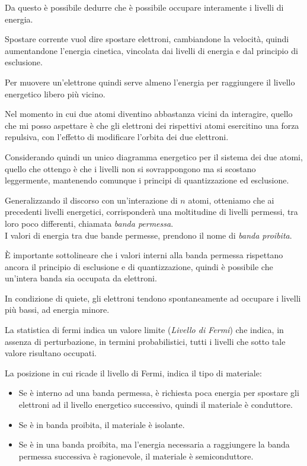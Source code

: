 \documentclass[../template]{subfiles}
\begin{document}
Da questo è possibile dedurre che è possibile occupare interamente i livelli di energia.

Spostare corrente vuol dire spostare elettroni, cambiandone la velocità, quindi aumentandone l'energia cinetica, vincolata dai livelli di energia e dal principio di esclusione.

Per muovere un'elettrone quindi serve almeno l'energia per raggiungere il livello energetico libero più vicino.

Nel momento in cui due atomi diventino abbastanza vicini da interagire, quello che mi posso aspettare è che gli elettroni dei rispettivi atomi esercitino una forza repulsiva, con l'effetto di modificare l'orbita dei due elettroni.

Considerando quindi un unico diagramma energetico per il sistema dei due atomi, quello che ottengo è che i livelli non si sovrappongono ma si scostano leggermente, mantenendo comunque i principi di quantizzazione ed esclusione.

Generalizzando il discorso con un'interazione di $n$ atomi, otteniamo che ai precedenti livelli energetici, corrisponderà una moltitudine di livelli permessi, tra loro poco differenti, chiamata \textit{banda permessa}.
\\
I valori di energia tra due bande permesse, prendono il nome di \textit{banda proibita}.

È importante sottolineare che i valori interni alla banda permessa rispettano ancora il principio di esclusione e di quantizzazione, quindi è possibile che un'intera banda sia occupata da elettroni.

In condizione di quiete, gli elettroni tendono spontaneamente ad occupare i livelli più bassi, ad energia minore.

La statistica di fermi indica un valore limite (\textit{Livello di Fermi}) che indica, in assenza di perturbazione, in termini probabilistici, tutti i livelli che sotto tale valore risultano occupati.

La posizione in cui ricade il livello di Fermi, indica il tipo di materiale:
\begin{itemize}
    \item Se è interno ad una banda permessa, è richiesta poca energia per spostare gli elettroni ad il livello energetico successivo, quindi il materiale è conduttore.
    \item Se è in banda proibita, il materiale è isolante.
    \item Se è in una banda proibita, ma l'energia necessaria a raggiungere la banda permessa successiva è ragionevole, il materiale è semiconduttore.
\end{itemize}
\end{document}
